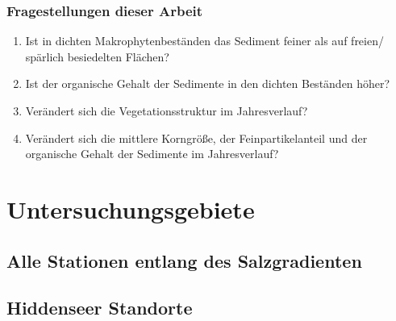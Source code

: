 \documentclass[xcolor=dvipsnames]{beamer}
\begin{document}
\begin{frame}
\frametitle{Fragestellungen dieser Arbeit}
\begin{enumerate}
\item Ist in dichten Makrophytenbeständen das Sediment feiner als auf freien/ spärlich besiedelten Flächen?
\pause
\item Ist der organische Gehalt der Sedimente in den dichten Beständen höher?
\pause
\item Verändert sich die Vegetationsstruktur im Jahresverlauf?
\pause
\item Verändert sich die mittlere Korngröße, der Feinpartikelanteil und der organische Gehalt der Sedimente im Jahresverlauf? 
\end{enumerate}
\end{frame}

\section{Untersuchungsgebiete}
\subsection{Alle Stationen entlang des Salzgradienten}

\subsection{Hiddenseer Standorte}
\end{document}
